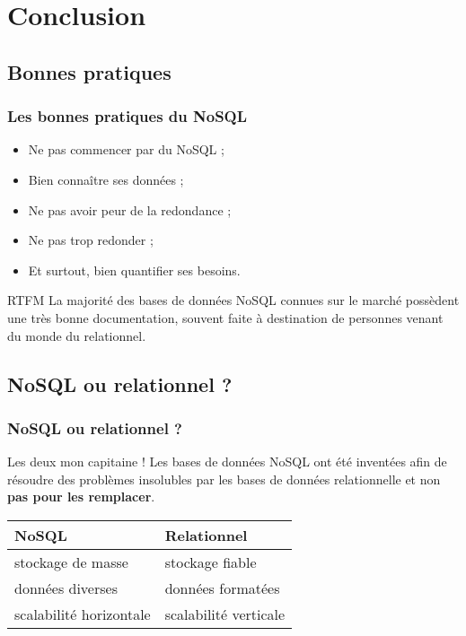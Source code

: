 \section{Conclusion}

	\subsection{Bonnes pratiques}
		\begin{frame}
			\frametitle{Les bonnes pratiques du NoSQL}

			\begin{itemize}
				\item Ne pas commencer par du NoSQL ;
				\item Bien connaître ses données ;
				\item Ne pas avoir peur de la redondance ;
				\item Ne pas trop redonder ;
				\item Et surtout, bien quantifier ses besoins.
			\end{itemize}


			\begin{block}{RTFM}
				La majorité des bases de données NoSQL connues sur le marché possèdent une très bonne documentation, souvent faite à destination de personnes venant du monde du relationnel.
			\end{block}
		\end{frame}

	\subsection{NoSQL ou relationnel ?}
		\begin{frame}
			\frametitle{NoSQL ou relationnel ?}

			\begin{alertblock}{Les deux mon capitaine !}
				Les bases de données NoSQL ont été inventées afin de résoudre des problèmes insolubles par les bases de données relationnelle et non \textbf{pas pour les remplacer}.
			\end{alertblock}

			\vspace{20px}

			\begin{tabular}{|l|l|}
				\hline
				\textbf{NoSQL} & \textbf{Relationnel} \\ \hline\hline
				stockage de masse & stockage fiable \\ \hline
				données diverses & données formatées \\ \hline
				scalabilité horizontale & scalabilité verticale \\ \hline
			\end{tabular}
		\end{frame}

